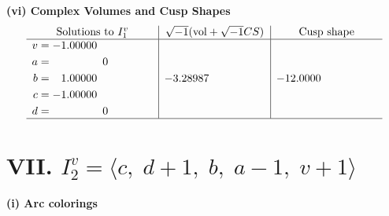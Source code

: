 \documentclass[1p]{elsarticle_modified}
\theoremstyle{definition}
\newcommand{\I}{\sqrt{-1}}
\begin{document}
\newpage\flushleft \textbf{(vi) Complex Volumes and Cusp Shapes}
$$\begin{array}{c|c|c}  
\text{Solutions to }I^v_{1}& \I (\text{vol} + \sqrt{-1}CS) & \text{Cusp shape}\\
 \hline 
\begin{aligned}
v &= -1.00000\phantom{ +0.000000I} \\
a &= \phantom{-0.000000 } 0 \\
b &= \phantom{-}1.00000\phantom{ +0.000000I} \\
c &= -1.00000\phantom{ +0.000000I} \\
d &= \phantom{-0.000000 } 0\end{aligned}
 & -3.28987\phantom{ +0.000000I} & -12.0000\phantom{ +0.000000I}\\
 \hline 
 \end{array}$$\newpage\newpage\renewcommand{\arraystretch}{1}
\centering \section*{VII. $I^v_{2}= \langle c,\;d+1,\;b,\;a-1,\;v+1 \rangle$}
\flushleft \textbf{(i) Arc colorings}\\
\end{document}

